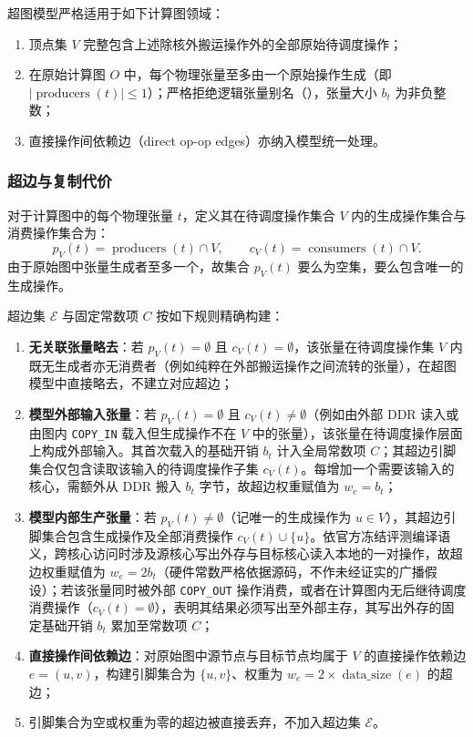 \documentclass[anonymous,withtoc]{gmcm2026}
\providecommand{\tightlist}{\setlength{\itemsep}{0pt}\setlength{\parskip}{0pt}}
\begin{document}
超图模型严格适用于如下计算图领域：

\begin{enumerate}
\def\labelenumi{\arabic{enumi}.}
\tightlist
\item
  顶点集 \(V\) 完整包含上述除核外搬运操作外的全部原始待调度操作；
\item
  在原始计算图 \(O\) 中，每个物理张量至多由一个原始操作生成（即 \(|\operatorname{producers}(t)| \le 1\)）；严格拒绝逻辑张量别名（\texttt{}），张量大小 \(b_t\) 为非负整数；
\item
  直接操作间依赖边（direct op-op edges）亦纳入模型统一处理。
\end{enumerate}

\subsubsection{超边与复制代价}

对于计算图中的每个物理张量 \(t\)，定义其在待调度操作集合 \(V\) 内的生成操作集合与消费操作集合为： \begin{equation}
p_V(t) = \operatorname{producers}(t) \cap V, \qquad c_V(t) = \operatorname{consumers}(t) \cap V.
\end{equation} 由于原始图中张量生成者至多一个，故集合 \(p_V(t)\) 要么为空集，要么包含唯一的生成操作。

超边集 \(\mathcal{E}\) 与固定常数项 \(C\) 按如下规则精确构建：

\begin{enumerate}
\def\labelenumi{\arabic{enumi}.}
\tightlist
\item
  \textbf{无关联张量略去}：若 \(p_V(t) = \emptyset\) 且 \(c_V(t) = \emptyset\)，该张量在待调度操作集 \(V\) 内既无生成者亦无消费者（例如纯粹在外部搬运操作之间流转的张量），在超图模型中直接略去，不建立对应超边；
\item
  \textbf{模型外部输入张量}：若 \(p_V(t) = \emptyset\) 且 \(c_V(t) \ne \emptyset\)（例如由外部 DDR 读入或由图内 \texttt{COPY\_IN} 载入但生成操作不在 \(V\) 中的张量），该张量在待调度操作层面上构成外部输入。其首次载入的基础开销 \(b_t\) 计入全局常数项 \(C\)；其超边引脚集合仅包含读取该输入的待调度操作子集 \(c_V(t)\)。每增加一个需要该输入的核心，需额外从 DDR 搬入 \(b_t\) 字节，故超边权重赋值为 \(w_e = b_t\)；
\item
  \textbf{模型内部生产张量}：若 \(p_V(t) \ne \emptyset\)（记唯一的生成操作为 \(u \in V\)），其超边引脚集合包含生成操作及全部消费操作 \(c_V(t) \cup \{u\}\)。依官方冻结评测编译语义，跨核心访问时涉及源核心写出外存与目标核心读入本地的一对操作，故超边权重赋值为 \(w_e = 2b_t\)（硬件常数严格依据源码，不作未经证实的广播假设）；若该张量同时被外部 \texttt{COPY\_OUT} 操作消费，或者在计算图内无后继待调度消费操作（\(c_V(t) = \emptyset\)），表明其结果必须写出至外部主存，其写出外存的固定基础开销 \(b_t\) 累加至常数项 \(C\)；
\item
  \textbf{直接操作间依赖边}：对原始图中源节点与目标节点均属于 \(V\) 的直接操作依赖边 \(e = (u, v)\)，构建引脚集合为 \(\{u, v\}\)、权重为 \(w_e = 2 \times \operatorname{data\_size}(e)\) 的超边；
\item
  引脚集合为空或权重为零的超边被直接丢弃，不加入超边集 \(\mathcal{E}\)。
\end{enumerate}
\end{document}
